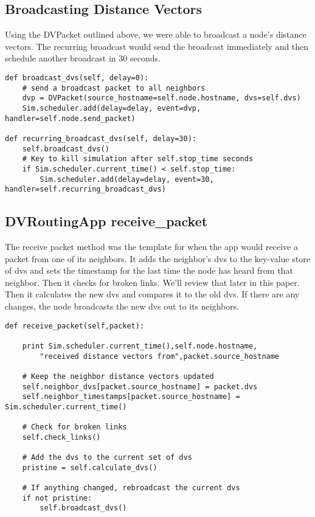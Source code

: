 \documentclass[11pt]{article}
\begin{document}
\vspace{5mm}

\subsection{Broadcasting Distance Vectors}

Using the DVPacket outlined above, we were able to broadcast a node's distance vectors. The recurring broadcast would send the broadcast immediately and then schedule another broadcast in 30 seconds.

\vspace{5mm}

\begin{lstlisting}
def broadcast_dvs(self, delay=0):
    # send a broadcast packet to all neighbors
    dvp = DVPacket(source_hostname=self.node.hostname, dvs=self.dvs)
    Sim.scheduler.add(delay=delay, event=dvp, handler=self.node.send_packet)

def recurring_broadcast_dvs(self, delay=30):
    self.broadcast_dvs()
    # Key to kill simulation after self.stop_time seconds
    if Sim.scheduler.current_time() < self.stop_time:
        Sim.scheduler.add(delay=delay, event=30, handler=self.recurring_broadcast_dvs)
\end{lstlisting}

\vspace{5mm}

\subsection{DVRoutingApp receive\_packet}

The receive packet method was the template for when the app would receive a packet from one of its neighbors. It adds the neighbor's dvs to the key-value store of dvs and sets the timestamp for the last time the node has heard from that neighbor. Then it checks for broken links. We'll review that later in this paper. Then it calculates the new dvs and compares it to the old dvs. If there are any changes, the node broadcasts the new dvs out to its neighbors.

\vspace{5mm}

\begin{lstlisting}
def receive_packet(self,packet):

    print Sim.scheduler.current_time(),self.node.hostname,
        "received distance vectors from",packet.source_hostname

    # Keep the neighbor distance vectors updated
    self.neighbor_dvs[packet.source_hostname] = packet.dvs
    self.neighbor_timestamps[packet.source_hostname] = Sim.scheduler.current_time()

    # Check for broken links
    self.check_links()

    # Add the dvs to the current set of dvs
    pristine = self.calculate_dvs()

    # If anything changed, rebroadcast the current dvs
    if not pristine:
        self.broadcast_dvs()
\end{lstlisting}
\end{document}

